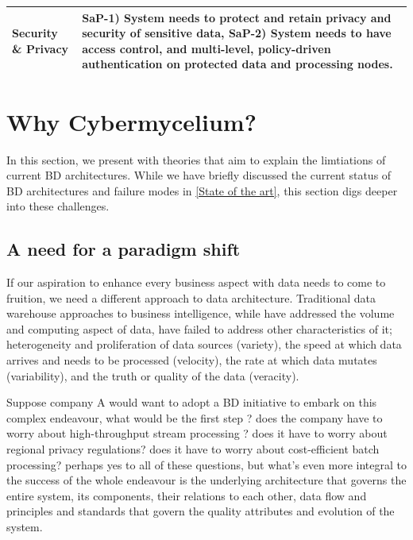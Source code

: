 \documentclass[review]{elsarticle}
\begin{document}
\begin{table}
\begin{tabular}{|m{1.2cm}|m{10.5cm}|}
        \hline

        Security \& Privacy & 
        
        \textbf{SaP-1)} System needs to protect and retain privacy and security of sensitive data, \textbf{SaP-2)} System needs to have access control, and multi-level, policy-driven authentication on protected data and processing nodes. 
        \\

        \hline
        
        
  
    \end{tabular}
    \label{table-requirements}
\end{table}

\section{Why Cybermycelium?} 

In this section, we present with theories that aim to explain the limtiations of current BD architectures. While we have briefly discussed the current status of BD architectures and failure modes in \ref{State of the art}, this section digs deeper into these challenges. 

\subsection{A need for a paradigm shift} \label{need for paradigm shift}

If our aspiration to enhance every business aspect with data needs to come to fruition, we need a different approach to data architecture. Traditional data warehouse approaches to business intelligence, while have addressed the volume and computing aspect of data, have failed to address other characteristics of it; heterogeneity and proliferation of data sources (variety), the speed at which data arrives and needs to be processed (velocity), the rate at which data mutates (variability), and the truth or quality of the data (veracity).


Suppose company A would want to adopt a BD initiative to embark on this complex endeavour, what would be the first step ? does the company have to worry about high-throughput stream processing ? does it have to worry about regional privacy regulations? does it have to worry about cost-efficient batch processing? perhaps yes to all of these questions, but what's even more integral to the success of the whole endeavour is the underlying architecture that governs the entire system, its components, their relations to each other, data flow and principles and standards that govern the quality attributes and evolution of the system.
\end{document}
